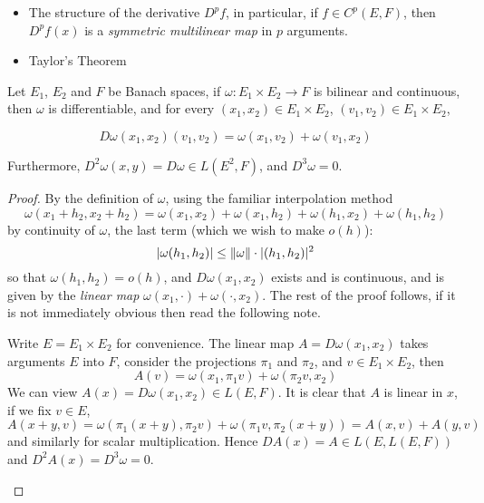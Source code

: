 \documentclass[../main-manifolds.tex]{subfiles}
\begin{document}
\begin{itemize}
    \item The structure of the derivative $D^p f$, in particular, if $f\in C^p(E,F)$, then $D^pf(x)$ is a \emph{symmetric multilinear map} in $p$ arguments. 
    \item Taylor's Theorem
\end{itemize}

\begin{wts}
    Let $E_1$, $E_2$ and $F$ be Banach spaces, if $\omega: E_1\times E_2\to F$ is bilinear and continuous, then $\omega$ is differentiable, and for every $(x_1, x_2)\in E_1\times E_2$, $(v_1,v_2)\in E_1\times E_2$,

    \[
        D\omega(x_1,x_2)(v_1,v_2) = \omega(x_1, v_2) + \omega(v_1, x_2)
    \]

    Furthermore, $D^2\omega(x,y) = D\omega\in L(E^2,F)$, and $D^3\omega = 0$.
    
\end{wts}
\begin{proof}
    By the definition of $\omega$, using the familiar interpolation method
    \[
        \omega(x_1 + h_2, x_2 + h_2) = \omega(x_1, x_2)  + \omega(x_1, h_2) + \omega(h_1, x_2) + \omega(h_1, h_2)
    \]
    by continuity of $\omega$, the last term (which we wish to make $o(h)$): 
    \[
    \vert \omega(h_1, h_2)\vert\leq \norm{\omega}\cdot\vert (h_1, h_2)\vert^2
    \]
    so that $\omega(h_1, h_2) = o(h)$, and $D\omega(x_1, x_2)$ exists and is continuous, and is given by the \emph{linear map} $\omega(x_1, \cdot) + \omega(\cdot, x_2)$. The rest of the proof follows, if it is not immediately obvious then read the following note.
    \begin{note}
        Write $E = E_1\times E_2$ for convenience. The linear map $A = D\omega(x_1, x_2)$ takes arguments $E$ into $F$, consider the projections $\pi_1$ and $\pi_2$, and $v\in E_1\times E_2$, then
        \[A(v) = \omega(x_1, \pi_1 v) + \omega(\pi_2 v, x_2)\]
        We can view $A(x) = D\omega(x_1, x_2)\in L(E,F)$. It is clear that $A$ is linear in $x$, if we fix $v\in E$, 
        \[
            A(x+y, v) = \omega(\pi_1(x+y), \pi_2 v) + \omega(\pi_1 v, \pi_2 (x+y)) = A(x,v) + A(y,v)
        \]
        and similarly for scalar multiplication. Hence $DA(x) = A\in L(E, L(E,F))$ and $D^2A(x) = D^3\omega = 0$.
    \end{note}
\end{proof}
\end{document}

